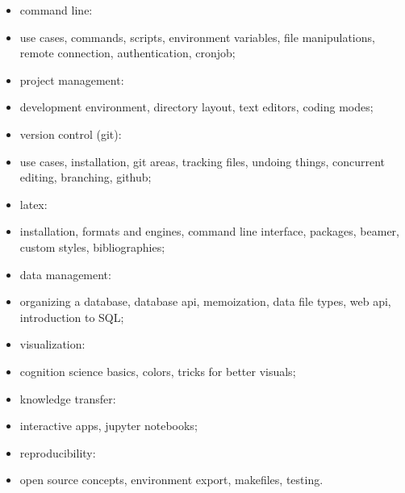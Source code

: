 \documentclass[12pt]{article}
\begin{document}
\begin{itemize}
    \item command line:
    \item[] use cases, commands, scripts, environment variables, file manipulations, remote connection, authentication, cronjob;
    \item project management:
    \item[] development environment, directory layout, text editors, coding modes;
    \item version control (git):
    \item[] use cases, installation, git areas, tracking files, undoing things, concurrent editing, branching, github;
    \item latex:
    \item[] installation, formats and engines, command line interface, packages, beamer, custom styles, bibliographies;
    \item data management:
    \item[] organizing a database, database api, memoization, data file types, web api, introduction to SQL;
    \item visualization:
    \item[] cognition science basics, colors, tricks for better visuals;
    \item knowledge transfer:
    \item[] interactive apps, jupyter notebooks;
    \item reproducibility:
    \item[] open source concepts, environment export, makefiles, testing.
\end{itemize}

\end{document}
